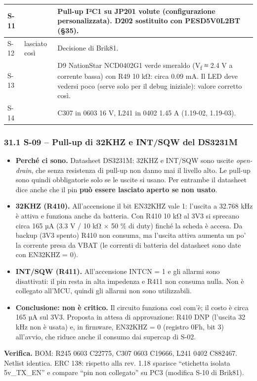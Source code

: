 {\begin{xltabular}{\linewidth}{>{\hsize\raggedright\arraybackslash}X>{\hsize\raggedright\arraybackslash}X>{\hsize\raggedright\arraybackslash}X}
S-11 &  & Pull-up I²C1 su JP201 volute (configurazione personalizzata). D202 sostituito con PESD5V0L2BT (§35). \\\midrule[0.15pt]
S-12 & lasciato così & Decisione di Brik81. \\\midrule[0.15pt]
S-13 &  & D9 NationStar NCD0402G1 verde smeraldo (V\textsubscript{f} ≈ 2.4 V a corrente bassa) con R49 10 kΩ: circa 0.09 mA. Il LED deve vedersi poco (serve solo per il debug iniziale): valore corretto così. \\\midrule[0.15pt]
S-14 &  & C307 in 0603 16 V, L241 in 0402 1.45 A (1.19-02, 1.19-03). \\
\end{xltabular}}

\subsubsection[31.1 S-09 – Pull-up di 32KHZ e INT/\allowbreak{}SQW del DS3231M]{31.1 S-09 – Pull-up di 32KHZ e INT/\allowbreak{}SQW del DS3231M}

\begin{itemize}
\item \textbf{Perché ci sono.} Datasheet DS3231M: 32KHZ e INT/\allowbreak{}SQW sono uscite \textit{open-drain}, che senza resistenza di pull-up non danno mai il livello alto. Le pull-up sono quindi obbligatorie solo se le uscite si usano. Per entrambe il datasheet dice anche che il pin \textbf{può essere lasciato aperto se non usato}.
\item \textbf{32KHZ (R410).} All'accensione il bit EN32KHZ vale 1: l'uscita a 32.768 kHz è attiva e funziona anche da batteria. Con R410 10 kΩ al 3V3 si sprecano circa 165 µA (3.3 V /\allowbreak{} 10 kΩ × 50 \% di duty) finché la scheda è accesa. Da backup (3V3 spento) R410 non consuma, ma l'uscita attiva aumenta un po' la corrente presa da VBAT (le correnti di batteria del datasheet sono date con EN32KHZ = 0).
\item \textbf{INT/\allowbreak{}SQW (R411).} All'accensione INTCN = 1 e gli allarmi sono disattivati: il pin resta in alta impedenza e R411 non consuma nulla. Non è collegato all'MCU, quindi gli allarmi non sono utilizzabili.
\item \textbf{Conclusione: non è critico.} Il circuito funziona così com'è; il costo è circa 165 µA sul 3V3. Proposta in attesa di approvazione: R410 DNP (l'uscita 32 kHz non è usata) e, in firmware, EN32KHZ = 0 (registro 0Fh, bit 3) all'avvio, che riduce anche il consumo dai supercap di S-02.
\end{itemize}

\textbf{Verifica.} BOM: R245 0603 C22775, C307 0603 C19666, L241 0402 C882467. Netlist identica. ERC 138: rispetto alla rev. 1.18 sparisce \textquotedblleft{}etichetta isolata 5v\_\allowbreak{}TX\_\allowbreak{}EN\textquotedblright{} e compare \textquotedblleft{}pin non collegato\textquotedblright{} su PC3 (modifica S-10 di Brik81).
